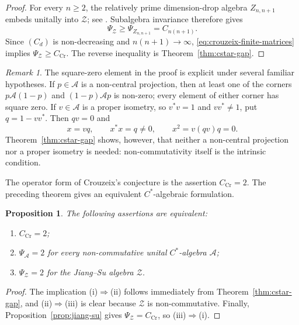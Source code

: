 \documentclass[a4paper]{amsart}
\newtheorem{proposition}[theorem]{Proposition}
\theoremstyle{remark}
\newtheorem{remark}[theorem]{Remark}
\newcommand{\calA}{\mathcal A}
\begin{document}
\begin{proof}
For every \(n\geqslant2\), the relatively prime dimension-drop algebra
\(Z_{n,n+1}\) embeds unitally into \(\mathcal Z\); see
\cite[Proposition~3.3]{RordamWinter}.  Subalgebra invariance therefore gives
\[
       \Psi_{\mathcal Z}\geqslant\Psi_{Z_{n,n+1}}
       =C_{n(n+1)}.
\]
Since \((C_d)\) is non-decreasing and \(n(n+1)\to\infty\),
\eqref{eq:crouzeix-finite-matrices} implies
\(\Psi_{\mathcal Z}\geqslant C_{\mathrm{Cr}}\).  The reverse inequality is
Theorem~\ref{thm:cstar-gap}.
\end{proof}

\begin{remark}\label{rem:cstar-square-zero}
The square-zero element in the proof is explicit under several familiar
hypotheses.  If \(p\in\calA\) is a non-central projection, then at least one of
the corners \(p\calA(1-p)\) and \((1-p)\calA p\) is non-zero; every element
of either corner has square zero.  If \(v\in\calA\) is a proper isometry, so
\(v^*v=1\) and \(vv^*\neq1\), put \(q=1-vv^*\).  Then \(qv=0\) and
\[
       x=vq,
       \qquad
       x^*x=q\neq0,
       \qquad
       x^2=v(qv)q=0.
\]
Theorem~\ref{thm:cstar-gap} shows, however, that neither a non-central
projection nor a proper isometry is needed: non-commutativity itself is the
intrinsic condition.
\end{remark}

The operator form of Crouzeix's conjecture is the assertion
\(C_{\mathrm{Cr}}=2\).  The preceding theorem gives an equivalent
\(C^*\)-algebraic formulation.

\begin{proposition}\label{prop:cstar-crouzeix}
The following assertions are equivalent:
\begin{enumerate}
\item[(i)] \(C_{\mathrm{Cr}}=2\);
\item[(ii)] \(\Psi_{\calA}=2\) for every non-commutative unital
      \(C^*\)-algebra \(\calA\);
\item[(iii)] \(\Psi_{\mathcal Z}=2\) for the Jiang--Su algebra \(\mathcal Z\).
\end{enumerate}
\end{proposition}

\begin{proof}
The implication \textup{(i)}\(\Rightarrow\)\textup{(ii)} follows immediately
from Theorem~\ref{thm:cstar-gap}, and \textup{(ii)}\(\Rightarrow\)\textup{(iii)}
is clear because \(\mathcal Z\) is non-commutative.  Finally,
Proposition~\ref{prop:jiang-su} gives
\(\Psi_{\mathcal Z}=C_{\mathrm{Cr}}\), so
\textup{(iii)}\(\Rightarrow\)\textup{(i)}.
\end{proof}
\end{document}
